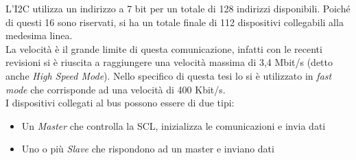 L'I2C utilizza un indirizzo a 7 bit per un totale di 128 indirizzi disponibili. Poiché di questi 16 sono riservati, si ha un totale finale di 112 dispositivi collegabili alla medesima linea.\\
La velocità è il grande limite di questa comunicazione, infatti con le recenti revisioni si è riuscita a raggiungere una velocità massima di 3,4 Mbit/s (detto anche \textit{High Speed Mode}). Nello specifico di questa tesi lo si è utilizzato in \textit{fast mode} che corrisponde ad una velocità di 400 Kbit/s.\\
I dispositivi collegati al bus possono essere di due tipi:
\begin{itemize}
	\item Un \textit{Master} che controlla la SCL, inizializza le comunicazioni e invia dati
	\item Uno o più \textit{Slave} che rispondono ad un master e inviano dati
\end{itemize}

